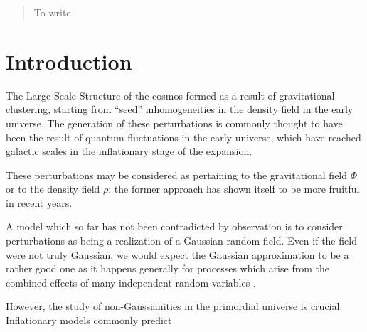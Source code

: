 \documentclass[main.tex]{subfiles}
\begin{document}
\begin{abstract}
    To write
\end{abstract}

\section{Introduction}

The Large Scale Structure of the cosmos formed as a result of gravitational clustering, starting from ``seed'' inhomogeneities in the density field in the early universe. 
The generation of these perturbations is commonly thought to have been the result of quantum fluctuations in the early universe, which have reached galactic scales in the inflationary stage of the expansion. 

These perturbations may be considered as pertaining to the gravitational field \(\Phi \) or to the density field \(\rho \): the former approach has shown itself to be more fruitful in recent years.

A model which so far has not been contradicted by observation is to consider perturbations as being a realization of a Gaussian random field. 
Even if the field were not truly Gaussian, we would expect the Gaussian approximation to be a rather good one as it happens generally for processes which arise from the combined effects of many independent random variables \cite[pag.\ 2]{celoriaPrimordialNonGaussianity2018}. 

However, the study of non-Gaussianities in the primordial universe is crucial. Inflationary models commonly predict 
\end{document}

